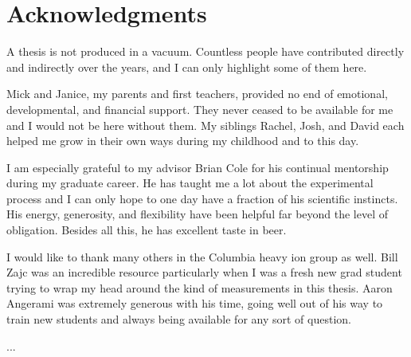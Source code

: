 \chapter{Acknowledgments} %

A thesis is not produced in a vacuum.
Countless people have contributed directly and indirectly over the years, and I can only highlight some of them here.

Mick and Janice, my parents and first teachers, provided no end of emotional, developmental, and financial support.
They never ceased to be available for me and I would not be here without them.
My siblings Rachel, Josh, and David each helped me grow in their own ways during my childhood and to this day.

I am especially grateful to my advisor Brian Cole for his continual mentorship during my graduate career.
He has taught me a lot about the experimental process and I can only hope to one day have a fraction of his scientific instincts.
His energy, generosity, and flexibility have been helpful far beyond the level of obligation.
Besides all this, he has excellent taste in beer.

I would like to thank many others in the Columbia heavy ion group as well.
Bill Zajc was an incredible resource particularly when I was a fresh new grad student trying to wrap my head around the kind of measurements in this thesis.
Aaron Angerami was extremely generous with his time, going well out of his way to train new students and always being available for any sort of question.

...

